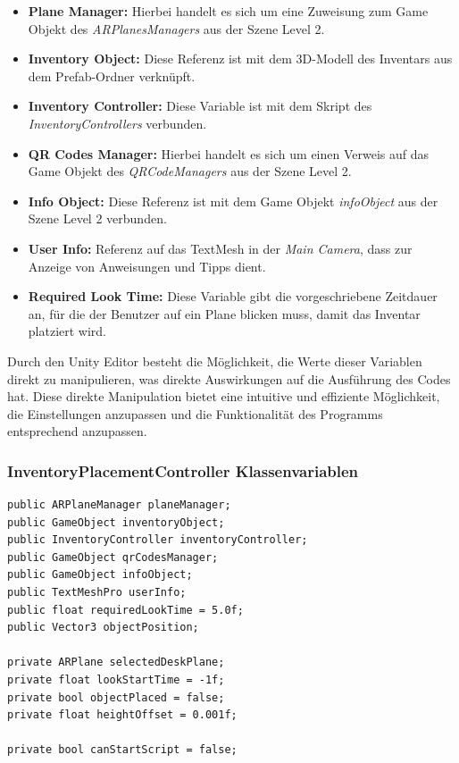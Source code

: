 \begin{itemize}
    \item \textbf{Plane Manager:} Hierbei handelt es sich um eine Zuweisung zum Game Objekt des \textit{ARPlanesManagers}
    aus der Szene Level 2.
    \item \textbf{Inventory Object:} Diese Referenz ist mit dem 3D-Modell des Inventars aus dem Prefab-Ordner verknüpft.
    \item \textbf{Inventory Controller:} Diese Variable ist mit dem Skript des \textit{InventoryControllers} verbunden.
    \item \textbf{QR Codes Manager:} Hierbei handelt es sich um einen Verweis auf das Game Objekt des \textit{QRCodeManagers}
    aus der Szene Level 2.
    \item \textbf{Info Object:} Diese Referenz ist mit dem Game Objekt \textit{infoObject} aus der Szene Level 2 verbunden.
    \item \textbf{User Info:} Referenz auf das TextMesh in der \textit{Main Camera}, dass zur Anzeige von Anweisungen und
    Tipps dient.
    \item \textbf{Required Look Time:} Diese Variable gibt die vorgeschriebene Zeitdauer an, für die der Benutzer auf ein
    Plane blicken muss, damit das Inventar platziert wird.
\end{itemize}

Durch den Unity Editor besteht die Möglichkeit, die Werte dieser Variablen direkt zu manipulieren, was direkte Auswirkungen
auf die Ausführung des Codes hat. Diese direkte Manipulation bietet eine intuitive und effiziente Möglichkeit, die
Einstellungen anzupassen und die Funktionalität des Programms entsprechend anzupassen.

\subsubsection{InventoryPlacementController Klassenvariablen}
\begin{lstlisting}[style=csharp, caption={Klassenvariablen der InventoryPlacementController Klasse}, label=code:anchor_var]
public ARPlaneManager planeManager;
public GameObject inventoryObject;
public InventoryController inventoryController;
public GameObject qrCodesManager;
public GameObject infoObject;
public TextMeshPro userInfo;
public float requiredLookTime = 5.0f;
public Vector3 objectPosition;

private ARPlane selectedDeskPlane;
private float lookStartTime = -1f;
private bool objectPlaced = false;
private float heightOffset = 0.001f;

private bool canStartScript = false;
\end{lstlisting}

